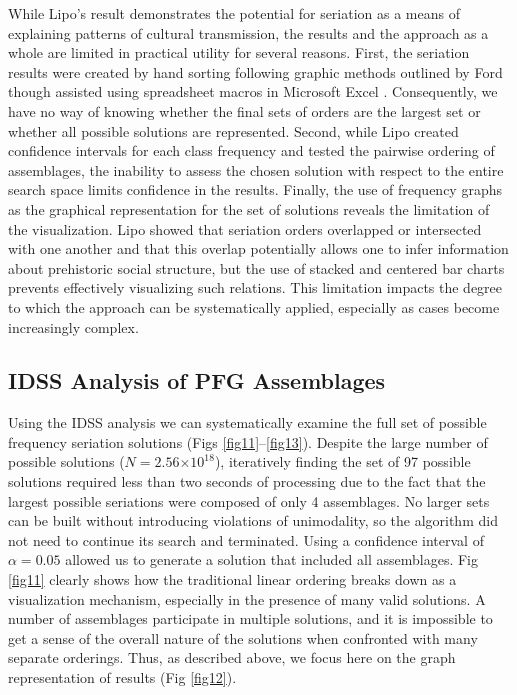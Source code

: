 \documentclass[10pt,letterpaper]{article}
\begin{document}
While Lipo’s result demonstrates the potential for seriation as a means of explaining patterns of cultural transmission, the results and the approach as a whole are limited in practical utility for several reasons. First, the seriation results were created by hand sorting following graphic methods outlined by Ford \cite{Ford1949,Phillips1951} though assisted using spreadsheet macros in Microsoft Excel \cite{Lipo2001a}. Consequently, we have no way of knowing whether the final sets of orders are the largest set or whether all possible solutions are represented. Second, while Lipo created confidence intervals for each class frequency and tested the pairwise ordering of assemblages, the inability to assess the chosen solution with respect to the entire search space limits confidence in the results. Finally, the use of frequency graphs as the graphical representation for the set of solutions reveals the limitation of the visualization. Lipo showed that seriation orders overlapped or intersected with one another and that this overlap potentially allows one to infer information about prehistoric social structure, but the use of stacked and centered bar charts prevents effectively visualizing such relations. This limitation impacts the degree to which the approach can be systematically applied, especially as cases become increasingly complex. 

\subsection*{IDSS Analysis of PFG Assemblages}

Using the IDSS analysis we can systematically examine the full set of possible frequency seriation solutions (Figs \ref{fig11}--\ref{fig13}). Despite the large number of possible solutions ($N = 2.56\ensuremath{\times 10^{18}}$), iteratively finding the set of 97 possible solutions required less than two seconds of processing due to the fact that the largest possible seriations were composed of only 4 assemblages. No larger sets can be built without introducing violations of unimodality, so the algorithm did not need to continue its search and terminated. Using a confidence interval of $\alpha = 0.05$ allowed us to generate a solution that included all assemblages. Fig \ref{fig11} clearly shows how the traditional linear ordering breaks down as a visualization mechanism, especially in the presence of many valid solutions. A number of assemblages participate in multiple solutions, and it is impossible to get a sense of the overall nature of the solutions when confronted with many separate orderings. Thus, as described above, we focus here on the graph representation of results (Fig \ref{fig12}). 
\end{document}
